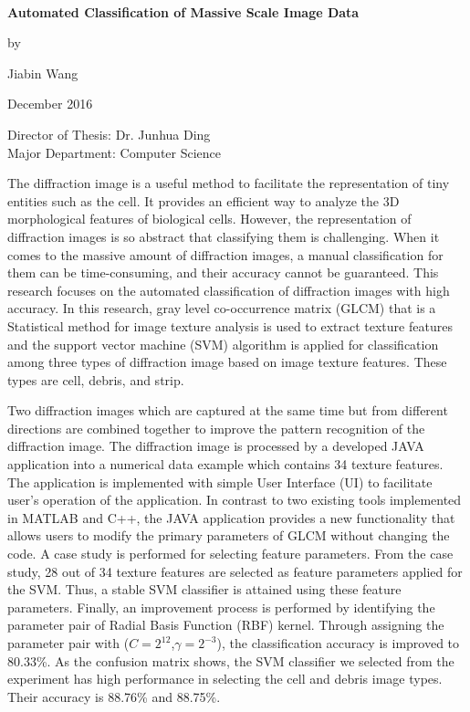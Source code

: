 
\hbox{\ }

\renewcommand{\baselinestretch}{2}
\small \normalsize
\begin{center}
\textbf{Automated Classification of Massive Scale Image Data}
\end{center}
\begin{center}
by
\end{center}
\begin{center}
Jiabin Wang
\end{center}
\begin{center}
December 2016
\end{center}
Director of Thesis:  Dr. Junhua Ding\\
Major Department:  Computer Science\par

\large \normalsize

The diffraction image is a useful method to facilitate the representation of tiny entities such as the cell. It provides an efficient way to analyze the 3D morphological features of biological cells.   However, the representation of diffraction images is so abstract that classifying them is challenging. When it comes to the massive amount of diffraction images, a manual classification for them can be time-consuming, and their accuracy cannot be guaranteed. This research focuses on the automated classification of diffraction images with high accuracy. In this research, gray level co-occurrence matrix (GLCM) that is a Statistical method for image texture analysis is used to extract texture features and the support vector machine (SVM) algorithm is applied for classification among three types of diffraction image based on image texture features. These types are cell, debris, and strip. \par
Two diffraction images which are captured at the same time but from different directions are combined together to improve the pattern recognition of the diffraction image. The diffraction image is processed by a developed JAVA application into a numerical data example which contains 34 texture features. The application is implemented with simple User Interface (UI) to facilitate user's operation of the application. In contrast to two existing tools implemented in MATLAB and C++, the JAVA application provides a new functionality that allows users to modify the primary parameters of GLCM without changing the code. A case study is performed for selecting feature parameters. From the case study, 28 out of 34 texture features are selected as feature parameters applied for the SVM. Thus, a stable SVM classifier is attained using these feature parameters. Finally, an improvement process is performed by identifying the parameter pair of Radial Basis Function (RBF) kernel. Through assigning the parameter pair with ($C = 2^{12}$,$\gamma = 2^{-3}$), the classification accuracy is improved to 80.33\%. As the confusion matrix shows, the SVM classifier we selected from the experiment has high performance in selecting the cell and debris image types. Their accuracy is 88.76\% and 88.75\%.   
\newpage
\mbox{}
